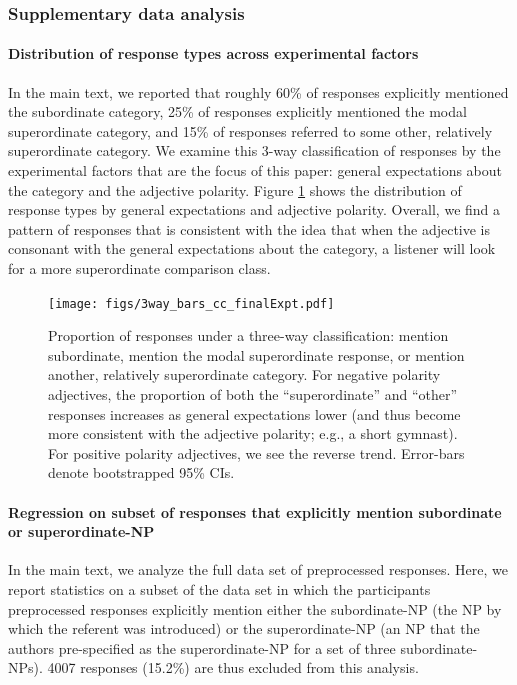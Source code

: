 \documentclass[doc]{apa6}
\begin{document}


\subsubsection{Supplementary data analysis}

\paragraph{Distribution of response types across experimental factors}

In the main text, we reported that roughly 60\% of responses explicitly mentioned the subordinate category, 25\% of responses explicitly mentioned the modal superordinate category, and 15\% of responses referred to some other, relatively superordinate category. We examine this 3-way classification of responses by the experimental factors that are the focus of this paper: general expectations about the category and the adjective polarity. 
Figure \ref{fig:3wayBars} shows the distribution of response types by general expectations and adjective polarity. Overall, we find a pattern of responses that is consistent with the idea that when the adjective is consonant with the general expectations about the category, a listener will look for a more superordinate comparison class. 

\begin{figure}[!t]
\centering
\texttt{[image: figs/3way\_bars\_cc\_finalExpt.pdf]}
\caption{Proportion of responses under a three-way classification: mention subordinate, mention the modal superordinate response, or mention another, relatively superordinate category. For negative polarity adjectives, the proportion of both the ``superordinate'' and ``other'' responses increases as general expectations lower (and thus become more consistent with the adjective polarity; e.g., a short gymnast). For positive polarity adjectives, we see the reverse trend. Error-bars denote bootstrapped 95\% CIs.}\label{fig:3wayBars}
\end{figure}



\paragraph{Regression on subset of responses that explicitly mention subordinate or superordinate-NP}
%
In the main text, we analyze the full data set of preprocessed responses. Here, we report statistics on a subset of the data set in which the participants preprocessed responses explicitly mention either the subordinate-NP (the NP by which the referent was introduced) or the superordinate-NP (an NP that the authors pre-specified as the superordinate-NP for a set of three subordinate-NPs). 
4007 responses (15.2\%) are thus excluded from this analysis. 
\end{document}
